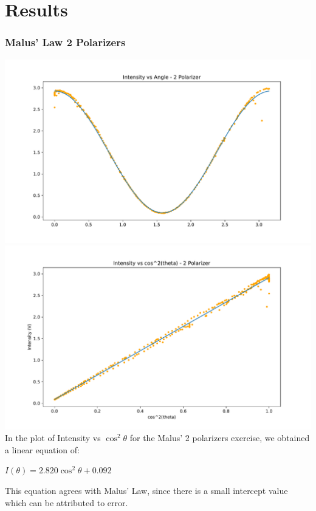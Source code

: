 \documentclass[a4paper, 11pt]{article}
\begin{document}
\section*{Results}

\subsubsection*{Malus' Law 2 Polarizers}
\includegraphics[width=\textwidth]{2pol-IntvsAng.pdf}	
\includegraphics[width=\textwidth]{2pol-linear.pdf}
In the plot of Intensity vs $\cos^{2}\theta$ for the Malus' 2 polarizers exercise, we obtained a linear equation of:
\begin{center}
$I(\theta) = 2.820\cos^2\theta + 0.092$
\end{center}
This equation agrees with Malus' Law, since there is a small intercept value which can be attributed to error.
\end{document}
